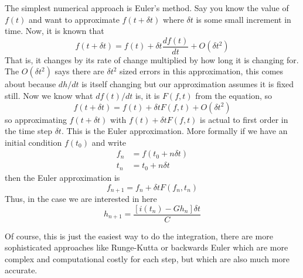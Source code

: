 \documentclass[12pt]{article}
\begin{document}
The simplest numerical approach is Euler's method. Say you know the value of $f(t)$ and want to approximate $f(t+\delta t)$ where $\delta t$ is some small increment in time. Now, it is known that
\begin{equation}
f(t+\delta t)=f(t)+\delta t \frac{df(t)}{dt}+O(\delta t^2)
\end{equation}
That is, it changes by its rate of change multiplied by how long it is
changing for. The $O(\delta t^2)$ says there are $\delta t^2$ sized
errors in this approximation, this comes about because $dh/dt$ is
itself changing but our approximation assumes it is fixed still. Now we
know what $df(t)/dt$ is, it is $F(f,t)$ from the equation, so
\begin{equation}
f(t+\delta t)=f(t)+\delta t F(f,t) + O(\delta t^2)
\end{equation}
so approximating $f(t+\delta t)$ with $f(t)+\delta t F(f,t)$ is actual
to first order in the time step $\delta t$. This is the Euler
approximation. More formally if we have an initial condition $f(t_0)$ and write
\begin{align}
f_n&=f(t_0+n\delta t)\\
t_n&=t_0+n\delta t
\end{align}
then the Euler approximation is
\begin{equation}
f_{n+1}=f_n+\delta t F(f_n,t_n)
\end{equation}
Thus, in the case we are interested in here
\begin{equation}
h_{n+1}=\frac{[i(t_n)-Gh_n]\delta t}{C}
\end{equation}

Of course, this is just the easiest way to do the integration, there
are more sophisticated approaches like Runge-Kutta or backwards Euler
which are more complex and computational costly for each step, but
which are also much more accurate.
\end{document}
